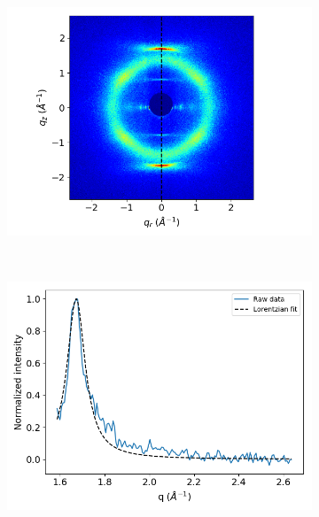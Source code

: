 \documentclass{article}
\begin{document}
  \begin{figure}[h]
  \centering
  \begin{subfigure}{0.45\textwidth}	
  	\includegraphics[width=\textwidth]{waxs_dashed.png}
	\caption{}~\label{fig:waxs_dashed}
  \end{subfigure}
  \begin{subfigure}{0.45\textwidth}
	\includegraphics[width=\textwidth]{Correlation_length_exp.png}
	\caption{}~\label{fig:correlation_length_exp}
  \end{subfigure}
  \caption{}~\label{fig:correlation}
  \end{figure}

\end{document}
